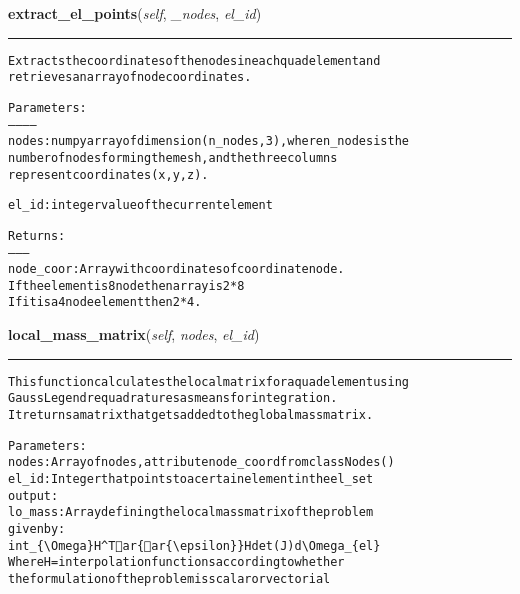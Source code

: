 \hspace{.8\funcindent}\begin{boxedminipage}{\funcwidth}

    \raggedright \textbf{extract\_el\_points}(\textit{self}, \textit{\_nodes}, \textit{el\_id})

    \vspace{-1.5ex}

    \rule{\textwidth}{0.5\fboxrule}
\setlength{\parskip}{2ex}
\begin{alltt}

Extracts the coordinates of the nodes in each quad element and
retrieves an array of node coordinates.

Parameters:
-----------
nodes:  numpy array of dimension (n\_nodes, 3), where n\_nodes is the 
        number of nodes forming the mesh, and the three columns 
        represent coordinates (x, y, z).
            
el\_id:   integer value of the current element

Returns:
--------
node\_coor: Array with coordinates of coordinate node. 
           If the element is 8 node then array is 2*8
           If it is a 4 node element then 2*4.
\end{alltt}

\setlength{\parskip}{1ex}
    \end{boxedminipage}

    \label{Classes:Quadrilaterals:local_mass_matrix}

    \vspace{0.5ex}

\hspace{.8\funcindent}\begin{boxedminipage}{\funcwidth}

    \raggedright \textbf{local\_mass\_matrix}(\textit{self}, \textit{nodes}, \textit{el\_id})

    \vspace{-1.5ex}

    \rule{\textwidth}{0.5\fboxrule}
\setlength{\parskip}{2ex}
\begin{alltt}

This function calculates the local matrix for a quad element using
Gauss Legendre   quadratures as means for integration.
It returns a matrix that gets added to the global mass matrix.

Parameters:
    nodes:  Array of nodes, attribute node\_coord from class Nodes()
    el\_id: Integer that points to a certain element in the el\_set
output: 
    lo\_mass: Array defining the local mass matrix of the problem
            given by:
                int\_\{{\textbackslash}Omega\} H{\textasciicircum}T ar\{ar\{{\textbackslash}epsilon\}\} H det(J) d {\textbackslash}Omega\_\{el\}
            Where H = interpolation functions according to whether
                      the formulation of the problem is scalar or vectorial
\end{alltt}

\setlength{\parskip}{1ex}
    \end{boxedminipage}


